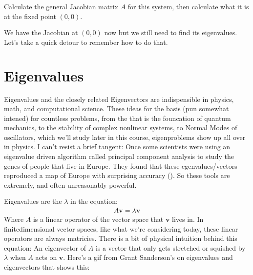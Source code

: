 \documentclass[letterpaper,10pt,english]{jupyterBook}
\begin{document}
\sphinxAtStartPar
Calculate the general Jacobian matrix \(A\) for this system, then calculate what it is at the fixed point \((0,0)\).

\sphinxAtStartPar
We have the Jacobian at \((0,0)\) now but we still need to find its eigenvalues. Let’s take a quick detour to remember how to do that.


\section{Eigenvalues}
\label{\detokenize{content/1_mechanics/dynamical_2:eigenvalues}}
\sphinxAtStartPar
Eigenvalues and the closely related Eigenvectors are indispensible in physics, math, and computational science. These ideas for the basis (pun somewhat intened) for countless problems, from the  that is the founcation of quantum mechanics, to the stability of complex nonlinear systems, to Normal Modes of oscillators, which we’ll study later in this course, eigenproblems show up all over in physics. I can’t resist a brief tangent: Once some scientists were using an eigenvalue driven algorithm called principal component analysis to study the genes of people that live in Europe. They found that these egenvalues/vectors reproduced a map of Europe with surprising accuracy (). So these tools are extremely, and often unreasonably powerful.

\sphinxAtStartPar
Eigenvalues are the \(\lambda\) in the equation:
\begin{equation*}
\begin{split}
A\mathbf{v} = \lambda \mathbf{v}
\end{split}
\end{equation*}
\sphinxAtStartPar
Where \(A\) is a linear operator of the vector space that \(\mathbf{v}\) lives in. In finite\sphinxhyphen{}dimensional vector spaces, like what we’re considering today, these linear operators are always matricies. There is a bit of physical intuition behind this equation: An eigenvector of \(A\) is a vector that only gets stretched or squished by \(\lambda\) when \(A\) acts on \(\mathbf{v}\). Here’s a gif from Grant Sanderson’s  on eigenvalues and eigenvectors that shows this:
\end{document}
